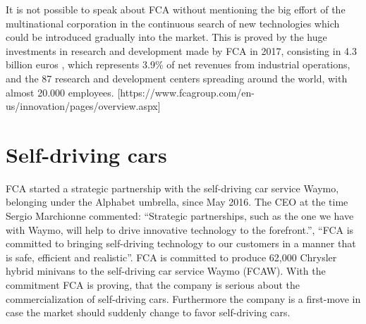      

It is not possible to speak about FCA without mentioning the big effort of the multinational corporation in the continuous search of new technologies which could be introduced gradually into the market. 
This is proved by the huge investments in research and development made by FCA in 2017, consisting in 4.3 billion euros , which represents 3.9\% of net revenues from industrial operations, and the 87 research and development centers spreading around the world, with almost 20.000 employees. [https://www.fcagroup.com/en-us/innovation/pages/overview.aspx]


\section{Self-driving cars}

FCA started a strategic partnership with the self-driving car service Waymo, belonging under the Alphabet umbrella, since May 2016. The CEO at the time Sergio Marchionne commented: “Strategic partnerships, such as the one we have with Waymo, will help to drive innovative technology to the forefront.”, “FCA is committed to bringing self-driving technology to our customers in a manner that is safe, efficient and realistic”. FCA is committed to produce 62,000 Chrysler hybrid minivans to the self-driving car service Waymo (FCAW). With the commitment FCA is proving, that the company is serious about the commercialization of self-driving cars. Furthermore the company is a first-move in case the market should suddenly change to favor self-driving cars.

